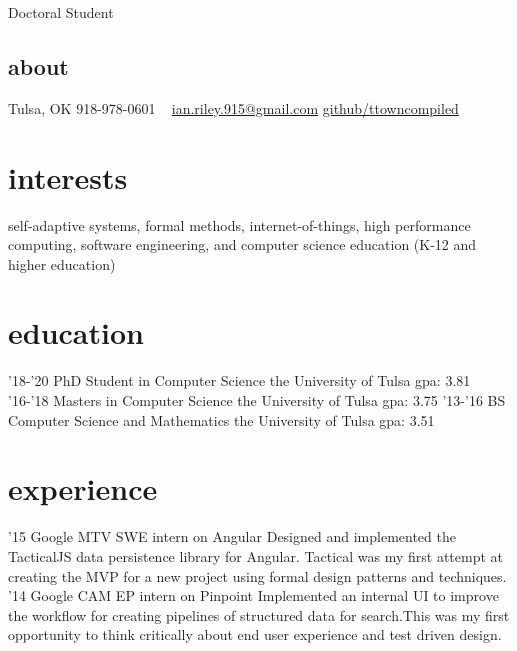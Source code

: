 \documentclass[print]{friggeri-cv}
\begin{document}
        {Doctoral Student}


  \begin{aside}
    \section{about}
      Tulsa, OK
      918-978-0601
      ~
      \href{mailto:ian.riley.915@gmail.com}{ian.riley.915@gmail.com}
      \href{https://github.com/ttowncompiled}{github/ttowncompiled}
  \end{aside}

  \section{interests}
  self-adaptive systems, formal methods, internet-of-things, high performance computing, software engineering, and computer science education (K-12 and higher education)

  \section{education}

    \begin{entrylist}
      \entry
        {'18-'20}
        {PhD Student in Computer Science}
        {the University of Tulsa}
        {gpa: 3.81}
      \entry
        {'16-'18}
        {Masters in Computer Science}
        {the University of Tulsa}
        {gpa: 3.75}
      \entry
        {'13-'16}
        {BS Computer Science and Mathematics}
        {the University of Tulsa}
        {gpa: 3.51}
    \end{entrylist}

  \section{experience}

    \begin{entrylist}
      \entry
        {'15}
        {Google MTV}
        {SWE intern on Angular}
        {Designed and implemented the TacticalJS data persistence library for Angular. Tactical was my first attempt at creating the MVP for a new project using formal design patterns and techniques.}
      \entry
        {'14}
        {Google CAM}
        {EP intern on Pinpoint}
        {Implemented an internal UI to improve the workflow for creating pipelines of structured data for search.This was my first opportunity to think critically about end user experience and test driven design.}
    \end{entrylist}
\end{document}
